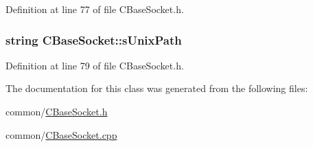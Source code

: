 \-Definition at line 77 of file \-C\-Base\-Socket.\-h.

\hypertarget{class_c_base_socket_af5ea32275a20e337e43689370a9e25ed}{
\subsubsection[{s\-Unix\-Path}]{\setlength{\rightskip}{0pt plus 5cm}string {\bf \-C\-Base\-Socket\-::s\-Unix\-Path}}}\label{class_c_base_socket_af5ea32275a20e337e43689370a9e25ed}


\-Definition at line 79 of file \-C\-Base\-Socket.\-h.



\-The documentation for this class was generated from the following files\-:\begin{DoxyCompactItemize}
\item 
common/\hyperlink{_c_base_socket_8h}{\-C\-Base\-Socket.\-h}\item 
common/\hyperlink{_c_base_socket_8cpp}{\-C\-Base\-Socket.\-cpp}\end{DoxyCompactItemize}
